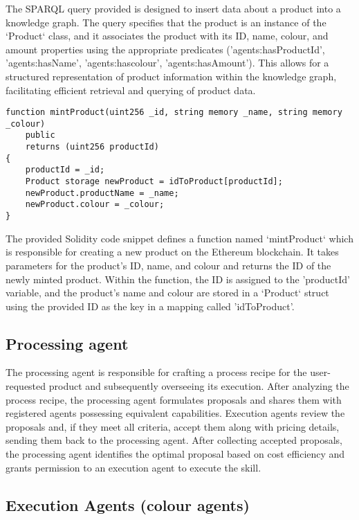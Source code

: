 \documentclass[conference]{IEEEtran}
\begin{document}
The SPARQL query provided is designed to insert data about a product into a knowledge graph. The query specifies that the product is an instance of the `Product` class, and it associates the product with its ID, name, colour, and amount properties using the appropriate predicates ('agents:hasProductId', 'agents:hasName', 'agents:hascolour', 'agents:hasAmount'). This allows for a structured representation of product information within the knowledge graph, facilitating efficient retrieval and querying of product data.

\begin{lstlisting} 
function mintProduct(uint256 _id, string memory _name, string memory _colour)
    public
    returns (uint256 productId)
{
    productId = _id;
    Product storage newProduct = idToProduct[productId];
    newProduct.productName = _name;
    newProduct.colour = _colour;
}
\end{lstlisting}
The provided Solidity code snippet defines a function named `mintProduct` which is responsible for creating a new product on the Ethereum blockchain. It takes parameters for the product's ID, name, and colour and returns the ID of the newly minted product. Within the function, the ID is assigned to the 'productId' variable, and the product's name and colour are stored in a `Product` struct using the provided ID as the key in a mapping called 'idToProduct'.

\subsection{Processing agent} 

The processing agent is responsible for crafting a process recipe for the user-requested product and subsequently overseeing its execution. After analyzing the process recipe, the processing agent formulates proposals and shares them with registered agents possessing equivalent capabilities. Execution agents review the proposals and, if they meet all criteria, accept them along with pricing details, sending them back to the processing agent. After collecting accepted proposals, the processing agent identifies the optimal proposal based on cost efficiency and grants permission to an execution agent to execute the skill.

\subsection{Execution Agents (colour agents)}
\end{document}
